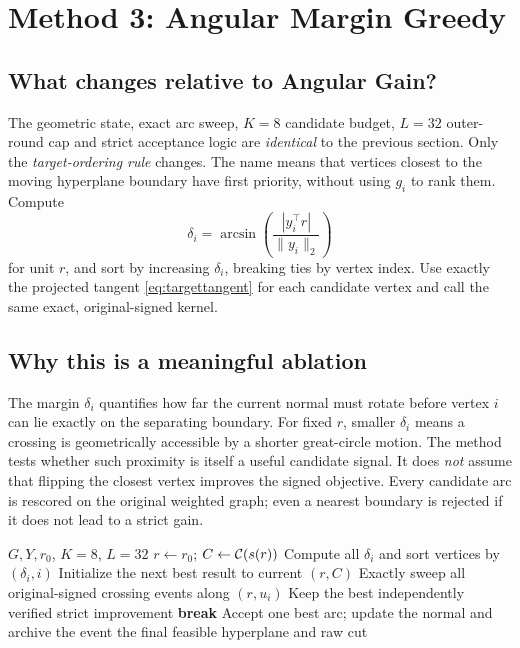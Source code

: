 \section{Method 3: Angular Margin Greedy}\label{sec:margin}
\subsection{What changes relative to Angular Gain?}
The geometric state, exact arc sweep, $K=8$ candidate budget, $L=32$ outer-round cap and strict acceptance logic are \emph{identical} to the previous section. Only the \emph{target-ordering rule} changes. The name  means that vertices closest to the moving hyperplane boundary have first priority, without using $g_i$ to rank them. Compute
\[
\delta_i=\arcsin\left(\frac{|y_i^\top r|}{\|y_i\|_2}\right)
\]
for unit $r$, and sort by increasing $\delta_i$, breaking ties by vertex index. Use exactly the projected tangent \eqref{eq:targettangent} for each candidate vertex and call the same exact, original-signed  kernel.

\subsection{Why this is a meaningful ablation}
The margin $\delta_i$ quantifies how far the current normal must rotate before vertex $i$ can lie exactly on the separating boundary. For fixed $r$, smaller $\delta_i$ means a crossing is geometrically accessible by a shorter great-circle motion. The method tests whether such proximity is itself a useful candidate signal. It does \emph{not} assume that flipping the closest vertex improves the signed objective. Every candidate arc is rescored on the original weighted graph; even a nearest boundary is rejected if it does not lead to a strict gain.

\begin{algorithm}[tb]
\caption{Angular Margin Greedy}\label{alg:margin}
\begin{algorithmic}[1]
\Require $G,Y,r_0$, $K=8$, $L=32$
\State $r\gets r_0$; $C\gets\mathcal{C}(s(r))$
 \State Compute all $\delta_i$ and sort vertices by $(\delta_i,i)$
 \State Initialize the next best result to current $(r,C)$
  \State Exactly sweep all original-signed crossing events along $(r,u_i)$
  \State Keep the best independently verified strict improvement
 \EndFor
  \State \textbf{break}\EndIf
 \State Accept one best arc; update the normal and archive the event
\EndFor
\State \Return the final feasible hyperplane and raw cut
\end{algorithmic}
\end{algorithm}


